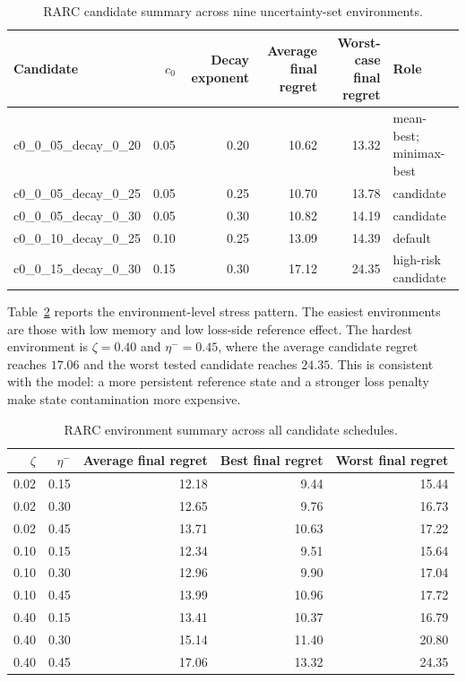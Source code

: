 \documentclass[conference]{../../LaTex_Template/IEEEtran}
\begin{document}
\begin{table}[t]
\centering
\caption{RARC candidate summary across nine uncertainty-set environments.}
\label{tab:rarc}
\begin{tabular}{lrrrrl}
\hline
Candidate & $c_0$ & Decay exponent & Average final regret & Worst-case final regret & Role\\
\hline
c0\_0\_05\_decay\_0\_20 & 0.05 & 0.20 & 10.62 & 13.32 & mean-best; minimax-best\\
c0\_0\_05\_decay\_0\_25 & 0.05 & 0.25 & 10.70 & 13.78 & candidate\\
c0\_0\_05\_decay\_0\_30 & 0.05 & 0.30 & 10.82 & 14.19 & candidate\\
c0\_0\_10\_decay\_0\_25 & 0.10 & 0.25 & 13.09 & 14.39 & default\\
c0\_0\_15\_decay\_0\_30 & 0.15 & 0.30 & 17.12 & 24.35 & high-risk candidate\\
\hline
\end{tabular}
\end{table}

Table~\ref{tab:environment} reports the environment-level stress pattern. The easiest environments are those with low memory and low loss-side reference effect. The hardest environment is $\zeta=0.40$ and $\eta^-=0.45$, where the average candidate regret reaches $17.06$ and the worst tested candidate reaches $24.35$. This is consistent with the model: a more persistent reference state and a stronger loss penalty make state contamination more expensive.

\begin{table}[t]
\centering
\caption{RARC environment summary across all candidate schedules.}
\label{tab:environment}
\begin{tabular}{rrrrr}
\hline
$\zeta$ & $\eta^-$ & Average final regret & Best final regret & Worst final regret\\
\hline
0.02 & 0.15 & 12.18 & 9.44 & 15.44\\
0.02 & 0.30 & 12.65 & 9.76 & 16.73\\
0.02 & 0.45 & 13.71 & 10.63 & 17.22\\
0.10 & 0.15 & 12.34 & 9.51 & 15.64\\
0.10 & 0.30 & 12.96 & 9.90 & 17.04\\
0.10 & 0.45 & 13.99 & 10.96 & 17.72\\
0.40 & 0.15 & 13.41 & 10.37 & 16.79\\
0.40 & 0.30 & 15.14 & 11.40 & 20.80\\
0.40 & 0.45 & 17.06 & 13.32 & 24.35\\
\hline
\end{tabular}
\end{table}
\end{document}
